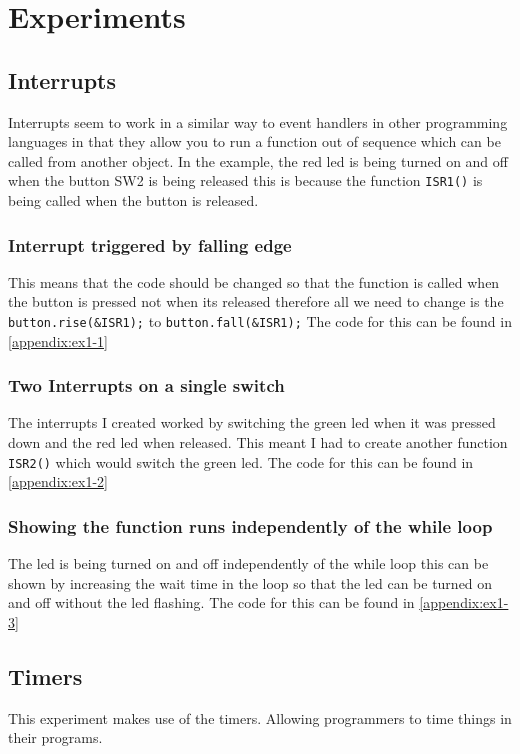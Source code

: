 \documentclass[a4paper,12pt]{scrartcl}
\begin{document}
	\section{Experiments}
	{
		\subsection{Interrupts}
		{
			Interrupts seem to work in a similar way to event handlers in other programming languages in that they allow you to run a function out of sequence which can be called from another object. In the example, the red led is being turned on and off when the button SW2 is being released this is because the function \lstinline|ISR1()| is being called when the button is released.
			\subsubsection{Interrupt triggered by falling edge}
			{
				This means that the code should be changed so that the function is called when the button is pressed not when its released therefore all we need to change is the \lstinline|button.rise(&ISR1);| to \lstinline|button.fall(&ISR1);| The code for this can be found in \cref{appendix:ex1-1}
			}
			\subsubsection{Two Interrupts on a single switch}
			{
				The interrupts I created worked by switching the green led when it was pressed down and the red led when released. This meant I had to create another function \lstinline|ISR2()| which would switch the green led. The code for this can be found in \cref{appendix:ex1-2}
			}
			
			\subsubsection{Showing the function runs independently of the while loop}
			{
				The led is being turned on and off independently of the while loop this can be shown by increasing the wait time in the loop so that the led can be turned on and off without the led flashing. The code for this can be found in \cref{appendix:ex1-3}
			}
		}
		\subsection{Timers}
		{
			This experiment makes use of the timers. Allowing programmers to time things in their programs.
}}
\end{document}
